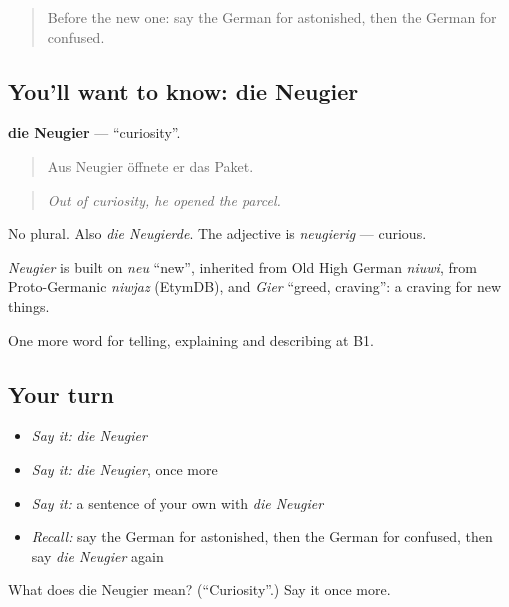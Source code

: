\begin{quote}
Before the new one: say the German for astonished, then the German for confused.
\end{quote}

\subsection*{You'll want to know: die Neugier}
\textbf{die Neugier} — \textquotedblleft{}curiosity\textquotedblright{}.

\begin{quote}
Aus Neugier öffnete er das Paket.
\end{quote}

\begin{quote}
\emph{Out of curiosity, he opened the parcel.}
\end{quote}

No plural. Also \emph{die Neugierde}. The adjective is \emph{neugierig} — curious.

\begin{cousinweb}
\emph{Neugier} is built on \emph{neu} \textquotedblleft{}new\textquotedblright{}, inherited from Old High German \emph{niuwi}, from Proto-Germanic \emph{niwjaz} (EtymDB), and \emph{Gier} \textquotedblleft{}greed, craving\textquotedblright{}: a craving for new things.
\end{cousinweb}

\begin{grammarlens}[title={What you've built}]
One more word for telling, explaining and describing at B1.
\end{grammarlens}

\subsection*{Your turn}
\begin{itemize}
\raggedright
  \item \emph{Say it:} \emph{die Neugier}
  \item \emph{Say it:} \emph{die Neugier}, once more
  \item \emph{Say it:} a sentence of your own with \emph{die Neugier}
  \item \emph{Recall:} say the German for astonished, then the German for confused, then say \emph{die Neugier} again
\end{itemize}

\begin{tcolorbox}[breakable,colback=teal!4,colframe=teal!35!black,title={Before you move on}]
What does die Neugier mean? (\textquotedblleft{}Curiosity\textquotedblright{}.) Say it once more.
\end{tcolorbox}
